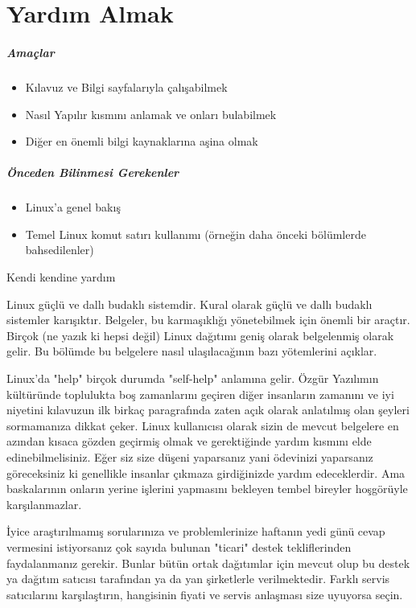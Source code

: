 \chapter{Yardım Almak}
\paragraph{Amaçlar}
\begin{itemize}
 \item Kılavuz ve Bilgi sayfalarıyla çalışabilmek
 \item Nasıl Yapılır kısmını anlamak ve onları bulabilmek
 \item Diğer en önemli bilgi kaynaklarına aşina olmak
 \end{itemize}
\paragraph{Önceden Bilinmesi Gerekenler}
\begin{itemize}
 \item Linux'a genel bakış
 \item Temel Linux komut satırı kullanımı (örneğin daha önceki bölümlerde bahsedilenler)
\end{itemize}
\begin{section}{Kendi kendine yardım}

Linux güçlü ve dallı budaklı sistemdir. Kural olarak güçlü ve dallı budaklı sistemler karışıktır. Belgeler, bu karmaşıklığı yönetebilmek için önemli bir araçtır. Birçok (ne yazık ki hepsi değil) Linux dağıtımı geniş olarak belgelenmiş olarak gelir. Bu bölümde bu belgelere nasıl ulaşılacağının bazı yötemlerini açıklar.

Linux'da "help" birçok durumda "self-help" anlamına gelir. Özgür Yazılımın kültüründe toplulukta boş zamanlarını geçiren diğer insanların zamanını ve iyi niyetini kılavuzun ilk birkaç paragrafında zaten açık olarak anlatılmış olan şeyleri sormamanıza dikkat çeker. Linux kullanıcısı olarak sizin de mevcut belgelere en azından kısaca gözden geçirmiş olmak ve gerektiğinde yardım kısmını elde edinebilmelisiniz. Eğer siz size düşeni yaparsanız yani ödevinizi yaparsanız göreceksiniz ki genellikle insanlar çıkmaza girdiğinizde yardım edeceklerdir. Ama baskalarının onların yerine işlerini yapmasını bekleyen tembel bireyler hoşgörüyle karşılanmazlar.

İyice araştırılmamış sorularınıza ve problemlerinize haftanın yedi günü cevap vermesini istiyorsanız çok sayıda bulunan "ticari" destek tekliflerinden faydalanmanız gerekir. Bunlar bütün ortak dağıtımlar için mevcut olup bu destek ya dağıtım satıcısı tarafından ya da yan şirketlerle verilmektedir. Farklı servis satıcılarını karşılaştırın, hangisinin fiyati ve servis anlaşması size uyuyorsa seçin.
\end{section}
